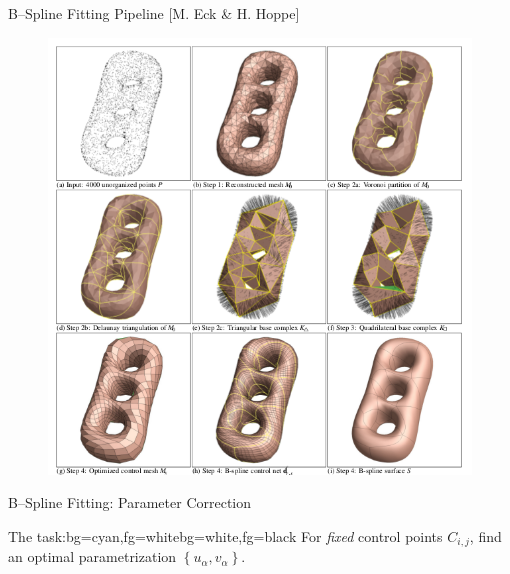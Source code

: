 \begin{frame}{B--Spline Fitting Pipeline [M. Eck \& H. Hoppe]}
\begin{figure}
\includegraphics[width=0.625\linewidth]{Pictures/HoppePipeline.png}
\end{figure}
\end{frame}

\begin{frame}{B--Spline Fitting: Parameter Correction}
\begin{variableblock}{The task:}{bg=cyan,fg=white}{bg=white,fg=black}
{
For \textit{fixed} control points $C_{i,j}$, find an optimal parametrization $\left\lbrace u_\alpha,v_\alpha \right\rbrace$.
}
\end{variableblock}

\end{frame}

